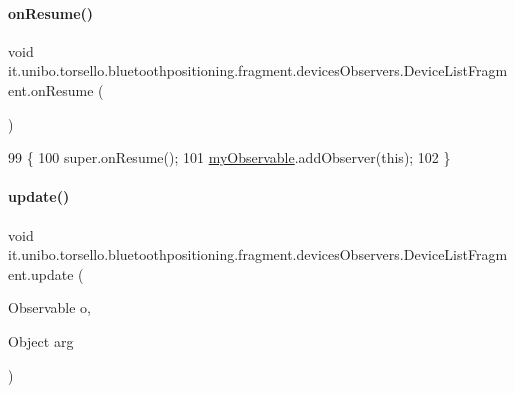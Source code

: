 \paragraph{\texorpdfstring{on\+Resume()}{onResume()}}
{\footnotesize\ttfamily void it.\+unibo.\+torsello.\+bluetoothpositioning.\+fragment.\+devices\+Observers.\+Device\+List\+Fragment.\+on\+Resume (\begin{DoxyParamCaption}{ }\end{DoxyParamCaption})}


\begin{DoxyCode}
99                            \{
100         super.onResume();
101         \hyperlink{classit_1_1unibo_1_1torsello_1_1bluetoothpositioning_1_1fragment_1_1devicesObservers_1_1DeviceListFragment_a437b28a367ed0f3f5f26e7994b10675d_a437b28a367ed0f3f5f26e7994b10675d}{myObservable}.addObserver(\textcolor{keyword}{this});
102     \}
\end{DoxyCode}
\hypertarget{classit_1_1unibo_1_1torsello_1_1bluetoothpositioning_1_1fragment_1_1devicesObservers_1_1DeviceListFragment_a9703aa2a0185098c909173d3b49cb448_a9703aa2a0185098c909173d3b49cb448}{}\label{classit_1_1unibo_1_1torsello_1_1bluetoothpositioning_1_1fragment_1_1devicesObservers_1_1DeviceListFragment_a9703aa2a0185098c909173d3b49cb448_a9703aa2a0185098c909173d3b49cb448} 
\paragraph{\texorpdfstring{update()}{update()}}
{\footnotesize\ttfamily void it.\+unibo.\+torsello.\+bluetoothpositioning.\+fragment.\+devices\+Observers.\+Device\+List\+Fragment.\+update (\begin{DoxyParamCaption}\item[{Observable}]{o,  }\item[{Object}]{arg }\end{DoxyParamCaption})}


